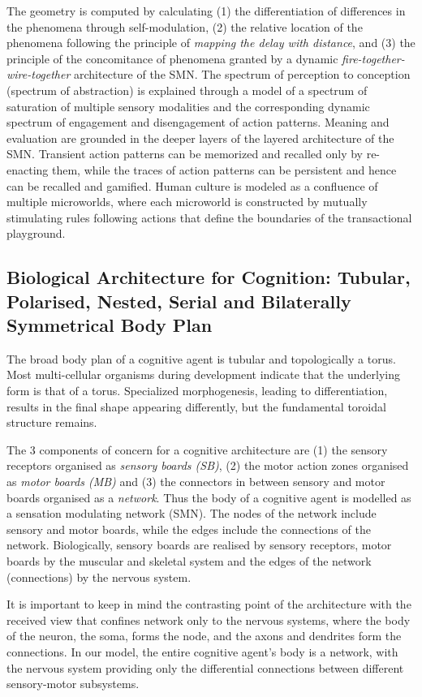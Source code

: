 The geometry is computed by calculating (1) the differentiation of differences in the phenomena through self-modulation, (2) the relative location of the phenomena following the principle of \textit{mapping the delay with distance}, and (3) the principle of the concomitance of phenomena granted by a dynamic \textit{fire-together-wire-together} architecture of the SMN. The spectrum of perception to conception (spectrum of abstraction) is explained through a model of a spectrum of saturation of multiple sensory modalities and the corresponding dynamic spectrum of engagement and disengagement of action patterns. Meaning and evaluation are grounded in the deeper layers of the layered architecture of the SMN. Transient action patterns can be memorized and recalled only by re-enacting them, while the traces of action patterns can be persistent and hence can be recalled and gamified. Human culture is modeled as a confluence of multiple microworlds, where each microworld is constructed by mutually stimulating rules following actions that define the boundaries of the transactional playground.

\subsection{Biological Architecture for Cognition: Tubular, Polarised, Nested, Serial and Bilaterally Symmetrical Body Plan}

The broad body plan of a cognitive agent is tubular and topologically a torus. Most multi-cellular organisms during development indicate that the underlying form is that of a torus. Specialized morphogenesis, leading to differentiation, results in the final shape appearing differently, but the fundamental toroidal structure remains.

The 3 components of concern for a cognitive architecture are (1) the sensory receptors organised as \textit{sensory boards (SB)}, (2) the motor action zones organised as \textit{motor boards (MB)} and (3) the connectors in between sensory and motor boards organised as a \textit{network}. Thus the body of a cognitive agent is modelled as a sensation modulating network (SMN). The nodes of the network include sensory and motor boards, while the edges include the connections of the network. Biologically, sensory boards are realised by sensory receptors, motor boards by the muscular and skeletal system and the edges of the network (connections) by the nervous system.

It is important to keep in mind the contrasting point of the architecture with the received view that confines network only to the nervous systems, where the body of the neuron, the soma, forms the node, and the axons and dendrites form the connections. In our model, the entire cognitive agent's body is a network, with the nervous system providing only the differential connections between different sensory-motor subsystems. 

